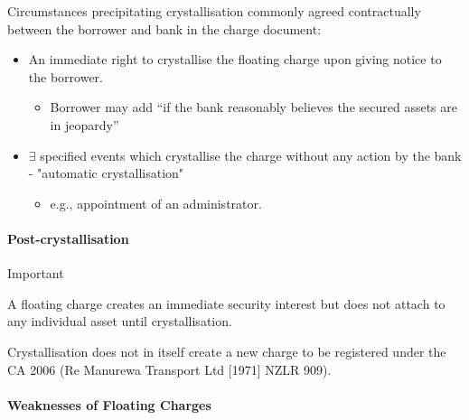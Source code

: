 \documentclass[
]{article}
\providecommand{\tightlist}{%
  \setlength{\itemsep}{0pt}\setlength{\parskip}{0pt}}
\newenvironment{env-be598745-44b1-4815-8875-ed2abeb511dd}
{
    \savenotes\tcolorbox[blanker,breakable,left=5pt,borderline west={2pt}{-4pt}{cyan}]
}
{
    \endtcolorbox\spewnotes
}
\begin{document}
Circumstances precipitating crystallisation commonly agreed
contractually between the borrower and bank in the charge document:

\begin{itemize}
\tightlist
\item
  An immediate right to crystallise the floating charge upon giving
  notice to the borrower.

  \begin{itemize}
  \tightlist
  \item
    Borrower may add ``if the bank reasonably believes the secured
    assets are in jeopardy''
  \end{itemize}
\item
  {\(\exists\)} specified events which crystallise the charge without
  any action by the bank - "automatic crystallisation"

  \begin{itemize}
  \tightlist
  \item
    e.g., appointment of an administrator.
  \end{itemize}
\end{itemize}

\hypertarget{post-crystallisation}{%
\paragraph{Post-crystallisation}\label{post-crystallisation}}

\begin{env-be598745-44b1-4815-8875-ed2abeb511dd}

Important

A floating charge creates an immediate security interest but does not
attach to any individual asset until crystallisation.

\end{env-be598745-44b1-4815-8875-ed2abeb511dd}

Crystallisation does not in itself create a new charge to be registered
under the CA 2006 (Re Manurewa Transport Ltd {[}1971{]} NZLR 909).

\hypertarget{weaknesses-of-floating-charges}{%
\paragraph{Weaknesses of Floating
Charges}\label{weaknesses-of-floating-charges}}
\end{document}
